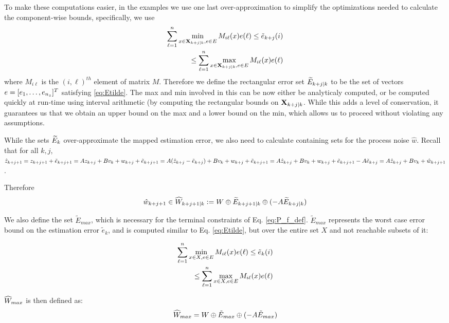 To make these computations easier, in the examples we use one last over-approximation to simplify the optimizations needed to calculate the component-wise bounds, specifically, we use 
\begin{eqnarray}
\label{eq:Etilde}
\sum_{\ell=1}^{n} \min_{x \in \mathbf{X}_{k+j|k}, e \in E} M_{i\ell}(x)e(\ell)  \leq \tilde{e}_{k+j}(i) 
\nonumber 
\\
\leq \sum_{\ell=1}^{n} \max_{x \in \mathbf{X}_{k+j|k}, e \in E} M_{i\ell}(x)e(\ell)
\end{eqnarray}
where $M_{i\ell}$ is the $(i,\ell)^{th}$ element of matrix $M$.
Therefore we define the rectangular error set $\widetilde{E}_{k+j|k}$ to be the set of vectors $e = [e_1,\ldots, e_{n_z}]^T$ satisfying \eqref{eq:Etilde}. The max and min involved in this can be now either be analyticaly computed, or be computed quickly at run-time using interval arithmetic (by computing the rectangular bounds on $\mathbf{X}_{k+j|k}$. While this adds a level of conservation, it guarantees us that we obtain an upper bound on the max and a lower bound on the min, which allows us to proceed without violating any assumptions.

While the sets $\widetilde{E}_{k}$ over-approximate the mapped estimation error, we also need to calculate containing sets for the process noise $\hat{w}$.
Recall that for all $k,j$, 
$\hat{z}_{k+j+1} = z_{k+j+1} + \tilde{e}_{k+j+1} = Az_{k+j}+Bv_k+w_{k+j} + \tilde{e}_{k+j+1} =  A(\hat{z}_{k+j} - \tilde{e}_{k+j}) + Bv_k + w_{k+j} + \tilde{e}_{k+j+1} = A\hat{z}_{k+j} + Bv_k + w_{k+j} + \tilde{e}_{k+j+1} - A \tilde{e}_{k+j} = A\hat{z}_{k+j} + Bv_k + \hat{w}_{k+j+1}$.

Therefore 
\begin{equation}
\label{eq:What}
\hat{w}_{k+j+1} \in \widehat{W}_{k+j+1|k} := W \oplus \widetilde{E}_{k+j+1|k} \oplus(-A\widetilde{E}_{k+j|k})
\end{equation}

We also define the set $\tilde{E}_{max}$, which is necessary for the terminal constraints of Eq. \ref{eq:P_f_def}. $\tilde{E}_{max}$ represents the worst case error bound on the estimation error $\tilde{e}_k$, and is computed similar to Eq. \ref{eq:Etilde}, but over the entire set $X$ and not reachable subsets of it:

\begin{eqnarray}
\label{eq:EtildeMax}
\sum_{\ell=1}^{n} \min_{x \in X, e \in E} M_{i\ell}(x)e(\ell)  \leq \tilde{e}_{k}(i) 
\nonumber 
\\
\leq \sum_{\ell=1}^{n} \max_{x \in X, e \in E} M_{i\ell}(x)e(\ell)
\end{eqnarray}

$\widehat{W}_{max}$ is then defined as:
\begin{equation}
\widehat{W}_{max} = W \oplus \tilde{E}_{max} \oplus (-A\tilde{E}_{max})
\end{equation}

